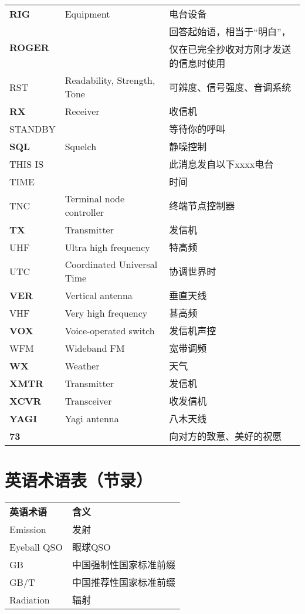 \begin{longtable}[l]{lll}
	\textbf{RIG} & Equipment & 电台设备 \\
	\multirow{2}{3em}{\textbf{ROGER}} & & 回答起始语，相当于“明白”， \\
	&  & 仅在已完全抄收对方刚才发送的信息时使用 \\
	RST & Readability, Strength, Tone & 可辨度、信号强度、音调系统 \\
	\textbf{RX} & Receiver & 收信机 \\
	STANDBY & & 等待你的呼叫 \\
	\textbf{SQL} & Squelch & 静噪控制 \\
	THIS IS & & 此消息发自以下xxxx电台 \\
	TIME & & 时间 \\
	TNC & Terminal node controller & 终端节点控制器 \\
	\textbf{TX} & Transmitter & 发信机 \\
	UHF & Ultra high frequency & 特高频 \\
	UTC & Coordinated Universal Time & 协调世界时 \\
	\textbf{VER} & Vertical antenna & 垂直天线 \\
	VHF & Very high frequency & 甚高频 \\
	\textbf{VOX} & Voice-operated switch & 发信机声控 \\
	WFM & Wideband FM & 宽带调频 \\
	\textbf{WX} & Weather & 天气 \\
	\textbf{XMTR} & Transmitter & 发信机 \\
	\textbf{XCVR} & Transceiver & 收发信机 \\
	\textbf{YAGI} & Yagi antenna & 八木天线 \\
	\textbf{73} & & 向对方的致意、美好的祝愿 \\
\end{longtable}


\newpage

\section{英语术语表（节录）}

\begin{longtable}[l]{ll}
	\textbf{英语术语} & \textbf{含义} \\
	Emission & 发射 \\
	Eyeball QSO & 眼球QSO \\
	GB & 中国强制性国家标准前缀 \\
	GB/T & 中国推荐性国家标准前缀 \\
	Radiation & 辐射 \\
\end{longtable}

